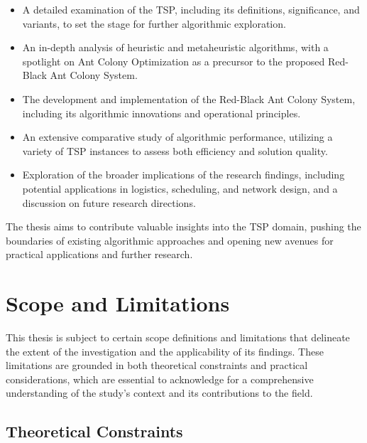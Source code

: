 \begin{itemize}
    \item A detailed examination of the TSP, including its definitions, significance, and variants, to set the stage for further algorithmic exploration.
    \item An in-depth analysis of heuristic and metaheuristic algorithms, with a spotlight on Ant Colony Optimization as a precursor to the proposed Red-Black Ant Colony System.
    \item The development and implementation of the Red-Black Ant Colony System, including its algorithmic innovations and operational principles.
    \item An extensive comparative study of algorithmic performance, utilizing a variety of TSP instances to assess both efficiency and solution quality.
    \item Exploration of the broader implications of the research findings, including potential applications in logistics, scheduling, and network design, and a discussion on future research directions.
\end{itemize}

The thesis aims to contribute valuable insights into the TSP domain, pushing the boundaries of existing algorithmic approaches and opening new avenues for practical applications and further research.


\section{Scope and Limitations}

This thesis is subject to certain scope definitions and limitations that delineate the extent of the investigation and the applicability of its findings. These limitations are grounded in both theoretical constraints and practical considerations, which are essential to acknowledge for a comprehensive understanding of the study's context and its contributions to the field.

\subsection{Theoretical Constraints}

